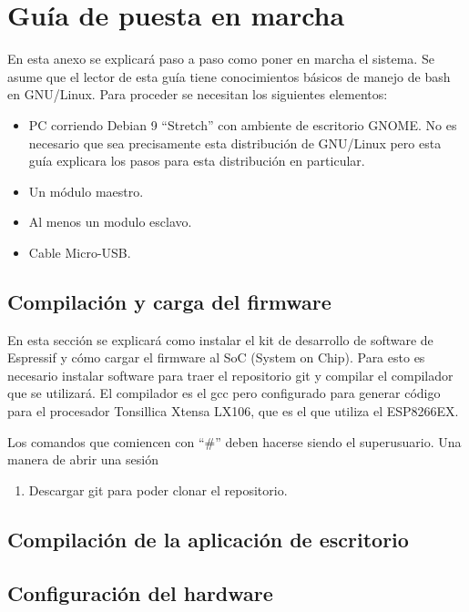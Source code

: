 
\setcounter{figure}{0}
\section{Guía de puesta en marcha}
En esta anexo se explicará paso a paso como poner en marcha el sistema. Se asume que el lector de esta guía tiene conocimientos básicos de manejo de bash en GNU/Linux.
Para proceder se necesitan los siguientes elementos:
\begin{itemize}
	\item PC corriendo Debian 9 \enquote{Stretch} con ambiente de escritorio GNOME. No es necesario que sea precisamente esta distribución de GNU/Linux pero esta guía explicara los pasos para esta distribución en particular.
	\item Un módulo maestro.
	\item Al menos un modulo esclavo.
	\item Cable Micro-USB.
\end{itemize}

\subsection{Compilación y carga del firmware}
En esta sección se explicará como instalar el kit de desarrollo de software de Espressif y cómo cargar el firmware al SoC (System on Chip). Para esto es necesario instalar software para traer el repositorio git y compilar el compilador que se utilizará. El compilador es el gcc pero configurado para generar código para el procesador Tonsillica Xtensa LX106, que es el que utiliza el ESP8266EX.

Los comandos que comiencen con \enquote{\#} deben hacerse siendo el superusuario. Una manera de abrir una sesión 
\begin{enumerate}
	\item Descargar git para poder clonar el repositorio.
\end{enumerate}

\subsection{Compilación de la aplicación de escritorio}
\subsection{Configuración del hardware}